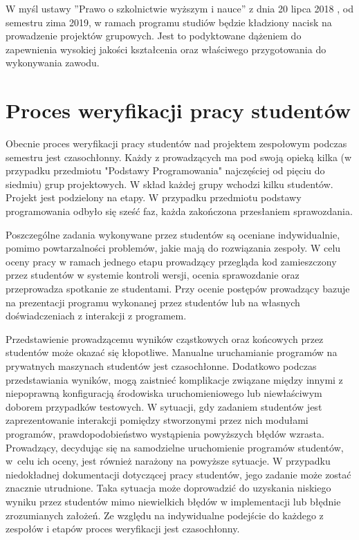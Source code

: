 W myśl ustawy ”Prawo o szkolnictwie wyższym i nauce” z dnia 20 lipca 2018 \cite{higher-education-law}, od semestru zima 2019, w ramach programu studiów będzie kładziony nacisk na prowadzenie projektów grupowych.
Jest to podyktowane dążeniem do zapewnienia wysokiej jakości kształcenia oraz właściwego przygotowania do wykonywania zawodu.

\vfill

\section{Proces weryfikacji pracy studentów}

Obecnie proces weryfikacji pracy studentów nad projektem zespołowym podczas semestru jest czasochłonny.
Każdy z prowadzących ma pod swoją opieką kilka (w przypadku przedmiotu "Podstawy Programowania" najczęściej od pięciu do siedmiu) grup projektowych.
W skład każdej grupy wchodzi kilku studentów.
Projekt jest podzielony na etapy. 
W przypadku przedmiotu podstawy programowania odbyło się sześć faz, każda zakończona przesłaniem sprawozdania.

Poszczególne zadania wykonywane przez studentów są oceniane indywidualnie, pomimo powtarzalności problemów, jakie mają do rozwiązania zespoły.
W celu oceny pracy w ramach jednego etapu prowadzący przegląda kod zamieszczony przez studentów w systemie kontroli wersji, ocenia sprawozdanie oraz przeprowadza spotkanie ze studentami.
Przy ocenie postępów prowadzący bazuje na prezentacji programu wykonanej przez studentów lub na własnych doświadczeniach z interakcji z programem.

Przedstawienie prowadzącemu wyników cząstkowych oraz końcowych przez studentów może okazać się kłopotliwe.
Manualne uruchamianie programów na prywatnych maszynach studentów jest czasochłonne.
Dodatkowo podczas przedstawiania wyników, mogą zaistnieć komplikacje związane między innymi z niepoprawną konfiguracją środowiska uruchomieniowego lub niewłaściwym doborem przypadków testowych.
W sytuacji, gdy zadaniem studentów jest zaprezentowanie interakcji pomiędzy stworzonymi przez nich modułami programów, prawdopodobieństwo wystąpienia powyższych błędów wzrasta.
Prowadzący, decydując się na samodzielne uruchomienie programów studentów, w~celu ich oceny, jest również narażony na powyższe sytuacje.
W przypadku niedokładnej dokumentacji dotyczącej pracy studentów, jego zadanie może zostać znacznie utrudnione.
Taka sytuacja może doprowadzić do uzyskania niskiego wyniku przez studentów mimo niewielkich błędów w implementacji lub błędnie zrozumianych założeń.
Ze względu na indywidualne podejście do każdego z zespołów i etapów proces weryfikacji jest czasochłonny.

